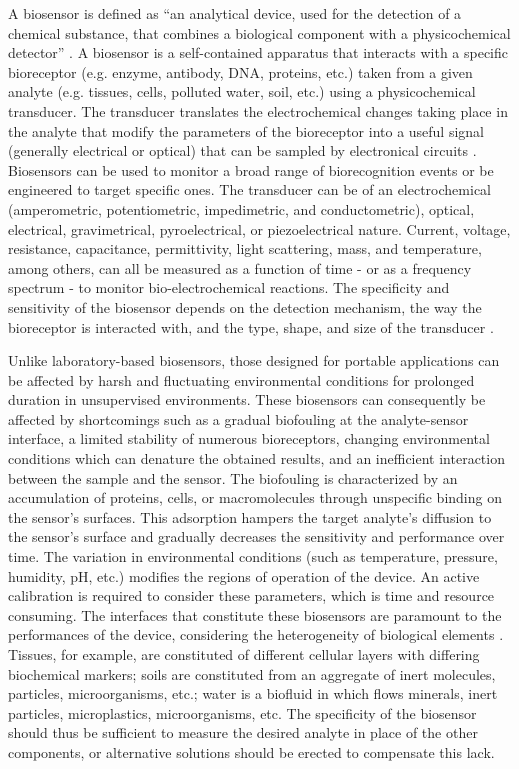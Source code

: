 A biosensor is defined as “an analytical device, used for the detection of a chemical substance, that combines a biological component with a physicochemical detector” \cite{turner1987biosensors}. A biosensor is a self-contained apparatus that interacts with a specific bioreceptor (e.g. enzyme, antibody, DNA, proteins, etc.) taken from a given analyte (e.g. tissues, cells, polluted water, soil, etc.) using a physicochemical transducer. The transducer translates the electrochemical changes taking place in the analyte that modify the parameters of the bioreceptor into a useful signal (generally electrical or optical) that can be sampled by electronical circuits \cite{Kim2019}. Biosensors can be used to monitor a broad range of biorecognition events or be engineered to target specific ones. The transducer can be of an electrochemical (amperometric, potentiometric, impedimetric, and conductometric), optical, electrical, gravimetrical, pyroelectrical, or piezoelectrical nature. Current, voltage, resistance, capacitance, permittivity, light scattering, mass, and temperature, among others, can all be measured as a function of time - or as a frequency spectrum - to monitor bio-electrochemical reactions. The specificity and sensitivity of the biosensor depends on the detection mechanism, the way the bioreceptor is interacted with, and the type, shape, and size of the transducer \cite{Maas2018}. \par

Unlike laboratory-based biosensors, those designed for portable applications can be affected by harsh and fluctuating environmental conditions for prolonged duration in unsupervised environments. These biosensors can consequently be affected by shortcomings such as a gradual biofouling at the analyte-sensor interface, a limited stability of numerous bioreceptors, changing environmental conditions which can denature the obtained results, and an inefficient interaction between the sample and the sensor. The biofouling is characterized by an accumulation of proteins, cells, or macromolecules through unspecific binding on the sensor’s surfaces. This adsorption hampers the target analyte’s diffusion to the sensor’s surface and gradually decreases the sensitivity and performance over time. The variation in environmental conditions (such as temperature, pressure, humidity, pH, etc.) modifies the regions of operation of the device. An active calibration is required to consider these parameters, which is time and resource consuming. The interfaces that constitute these biosensors are paramount to the performances of the device, considering the heterogeneity of biological elements \cite{Kim2019}. Tissues, for example, are constituted of different cellular layers with differing biochemical markers; soils are constituted from an aggregate of inert molecules, particles, microorganisms, etc.; water is a biofluid in which flows minerals, inert particles, microplastics, microorganisms, etc. The specificity of the biosensor should thus be sufficient to measure the desired analyte in place of the other components, or alternative solutions should be erected to compensate this lack. \par

